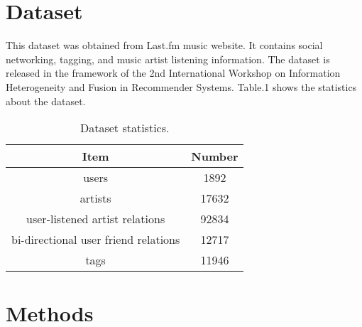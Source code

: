\documentclass{sig-alternate}
\begin{document}
\section{Dataset}
This dataset was obtained from Last.fm \cite{lastfm} music website. It contains social networking, tagging, and music artist listening information. The dataset is released in the framework of the 2nd International Workshop on Information Heterogeneity and Fusion in Recommender Systems. Table.1 shows the statistics about the dataset.
\begin{table}[!t]
\centering
\caption{Dataset statistics.}
\begin{tabular}{cc}  %
\\
\hline 
Item  &  Number \\ \hline 
users    &   1892 \\ 
artists    &   17632 \\ 
user-listened artist relations    &   92834 \\ 
bi-directional user friend relations    &   12717 \\ 
tags    &   11946 \\ 
\hline 
\end{tabular}
\end{table}
\section{Methods}
\end{document}
